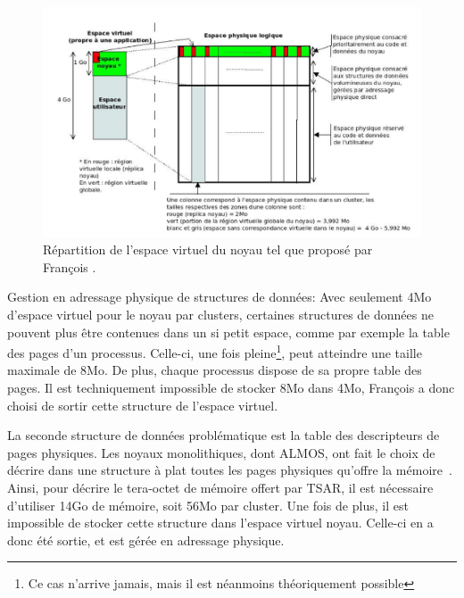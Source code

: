      \begin{figure}[ht]
        \centering \includegraphics[scale=0.3]{include/img/almos-guerret}
        \caption{Répartition de l'espace virtuel du noyau tel que proposé par
          François \citet{guerret2014exploitation}.}
        \label{fig:almos-guerret}
      \end{figure}

      \begin{paragraph}{Gestion en adressage physique de structures de données:}
        Avec seulement 4Mo d'espace virtuel pour le noyau par clusters,
        certaines structures de données ne pouvent plus être contenues dans un
        si petit espace, comme par exemple la table des pages d'un
        processus. Celle-ci, une fois pleine\footnote{Ce cas n'arrive jamais,
          mais il est néanmoins théoriquement possible}, peut atteindre une
        taille maximale de 8Mo. De plus, chaque processus dispose de sa propre
        table des pages. Il est techniquement impossible de stocker 8Mo dans
        4Mo, François a donc choisi de sortir cette structure de l'espace
        virtuel.

        La seconde structure de données problématique est la table des
        descripteurs de pages physiques. Les noyaux monolithiques, dont ALMOS,
        ont fait le choix de décrire dans une structure à plat toutes les pages
        physiques qu'offre la mémoire~\citep{cranor1999uvm,
          gorman2004understanding, russinovich2012windows, dillon2000design,
          steldt2009memory, steldtXXXXopenbsd}. Ainsi, pour décrire le
        tera-octet de mémoire offert par TSAR, il est nécessaire d'utiliser 14Go
        de mémoire, soit 56Mo par cluster. Une fois de plus, il est impossible
        de stocker cette structure dans l'espace virtuel noyau. Celle-ci en a
        donc été sortie, et est gérée en adressage physique.
      \end{paragraph}

